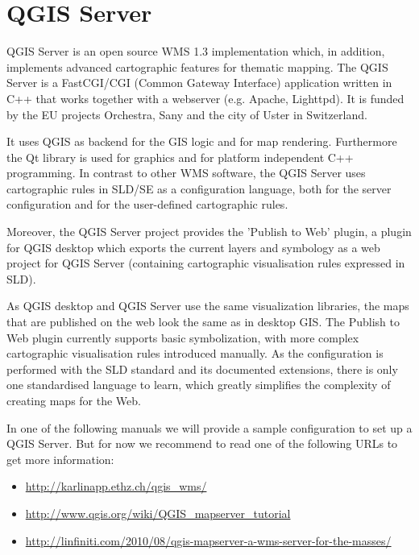
\chapter{QGIS Server}\label{label_qgisserver}

\updatedisclaimer

QGIS Server is an open source WMS 1.3 implementation which, in addition,
implements advanced cartographic features for thematic mapping. The QGIS
Server is a FastCGI/CGI (Common Gateway Interface) application written in
C++ that works together with a webserver (e.g. Apache, Lighttpd). It is 
funded by the EU projects Orchestra, Sany and the city of Uster in 
Switzerland.

It uses QGIS as backend for the GIS logic and for map rendering. Furthermore the 
Qt library is used for graphics and for platform independent 
C++ programming. In contrast to other WMS software, the QGIS Server uses 
cartographic rules in SLD/SE as a configuration language, both for the server 
configuration and for the user-defined cartographic rules. 

Moreover, the QGIS Server project provides the 'Publish to Web' plugin, a 
plugin for QGIS desktop which exports the current layers and symbology as a 
web project for QGIS Server (containing cartographic visualisation rules 
expressed in SLD).

As QGIS desktop and QGIS Server use the same visualization libraries, the
maps that are published on the web look the same as in desktop GIS. The 
Publish to Web plugin currently supports basic symbolization, with more complex 
cartographic visualisation rules introduced manually. As the configuration is 
performed with the SLD standard and its documented extensions, there is only 
one standardised language to learn, which greatly simplifies the complexity 
of creating maps for the Web.

In one of the following manuals we will provide a sample configuration to 
set up a QGIS Server. But for now we recommend to read one of the following 
URLs to get more information:

\begin{itemize}
\item \url{http://karlinapp.ethz.ch/qgis\_wms/} \\
\item \url{http://www.qgis.org/wiki/QGIS\_mapserver\_tutorial} \\
\item \url{http://linfiniti.com/2010/08/qgis-mapserver-a-wms-server-for-the-masses/}
\end{itemize}

